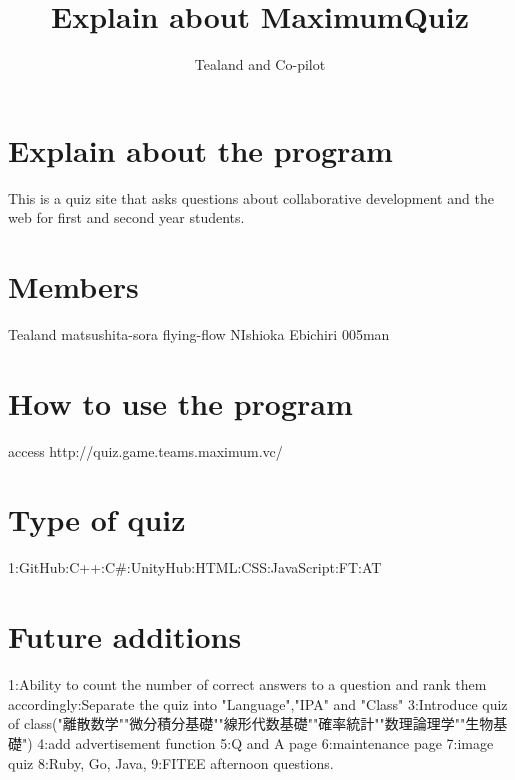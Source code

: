 \documentclass{article}%
\title{Explain about MaximumQuiz}  %
\author{Tealand and Co-pilot}
\begin{document}
\maketitle

\section{Explain about the program}

This is a quiz site that asks questions about collaborative development and the web for first and second year students.


\section{Members}

Tealand\newline
matsushita-sora\newline
flying-flow\newline
NIshioka\newline
Ebichiri\newline
005man\newline

\section{How to use the program}

access http://quiz.game.teams.maximum.vc/

\section{Type of quiz}

1:GitHub:C++:C#:UnityHub:HTML:CSS:JavaScript:FT:AT\newline

\section{Future additions}
1:Ability to count the number of correct answers to a question and rank them accordingly:Separate the quiz into "Language","IPA" and "Class" 
3:Introduce quiz of class("離散数学""微分積分基礎""線形代数基礎""確率統計""数理論理学""生物基礎")
4:add advertisement function
5:Q and A page
6:maintenance page
7:image quiz
8:Ruby, Go, Java, 
9:FITEE afternoon questions.
\end{document}
